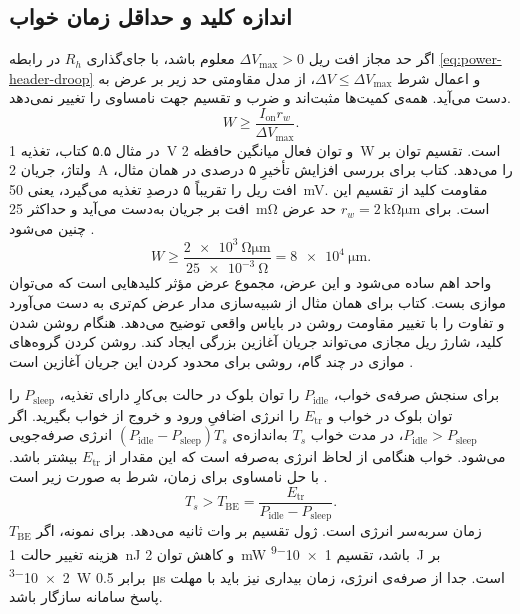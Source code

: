 \subsection{اندازه کلید و حداقل زمان خواب}
\label{sec:power-header-sizing}

اگر حد مجاز افت ریل \(\Delta V_{\max}>0\) معلوم باشد، با جای‌گذاری
\(R_h\) در رابطه \eqref{eq:power-header-droop} و اعمال شرط
\(\Delta V\leq\Delta V_{\max}\)، از مدل مقاومتی حد زیر بر عرض
به دست می‌آید. همه‌ی کمیت‌ها مثبت‌اند و ضرب و تقسیم جهت نامساوی
را تغییر نمی‌دهد.
\begin{equation}
  W\geq\frac{I_{\mathrm{on}}r_w}{\Delta V_{\max}}.
  \label{eq:power-header-width}
\end{equation}
در مثال ۵.۵ کتاب، تغذیه \qty{1}{\volt} و توان فعال میانگین حافظه
\qty{2}{\watt} است. تقسیم توان بر ولتاژ، جریان \qty{2}{\ampere}
را می‌دهد. کتاب برای بررسی افزایش تأخیرِ ۵ درصدی در همان مثال،
افت ریل را تقریباً ۵ درصدِ تغذیه می‌گیرد، یعنی
\qty{50}{\milli\volt}. مقاومت کلید از تقسیم این افت بر جریان
به‌دست می‌آید و حداکثر \qty{25}{\milli\ohm} است. برای
\(r_w=\qty{2}{\kilo\ohm\micro\metre}\) حد عرض چنین می‌شود
\cite[مثال ۵.۵، صفحات ۱۹۸ و ۱۹۹]{weste}.
\[
  W\geq\frac{\qty{2e3}{\ohm\micro\metre}}{\qty{25e-3}{\ohm}}
    =\qty{8e4}{\micro\metre}.
\]
واحد اهم ساده می‌شود و این عرض، مجموع عرض مؤثر کلیدهایی است که
می‌توان موازی بست. کتاب برای همان مثال از شبیه‌سازی مدار عرض کم‌تری
به دست می‌آورد و تفاوت را با تغییر مقاومت روشن در بایاس واقعی توضیح
می‌دهد. هنگام روشن شدن کلید، شارژ ریل مجازی می‌تواند جریان آغازین
بزرگی ایجاد کند. روشن کردن گروه‌های موازی در چند گام، روشی برای
محدود کردن این جریان آغازین است \cite[صفحه ۱۹۹]{weste}.

برای سنجش صرفه‌ی خواب، \(P_{\mathrm{idle}}\) را توان بلوک در حالت
بی‌کارِ دارای تغذیه، \(P_{\mathrm{sleep}}\) را توان بلوک در خواب و
\(E_{\mathrm{tr}}\) را انرژی اضافیِ ورود و خروج از خواب بگیرید.
اگر \(P_{\mathrm{idle}}>P_{\mathrm{sleep}}\)، در مدت خواب \(T_s\)
به‌اندازه‌ی \((P_{\mathrm{idle}}-P_{\mathrm{sleep}})T_s\) انرژی
صرفه‌جویی می‌شود. خواب هنگامی از لحاظ انرژی به‌صرفه است که این مقدار
از \(E_{\mathrm{tr}}\) بیشتر باشد. با حل نامساوی برای زمان، شرط
به صورت زیر است \cite[بخش ، صفحات ۱۹۷ و ۱۹۸]{weste}.
\begin{equation}
  T_s > T_{\mathrm{BE}}
      =\frac{E_{\mathrm{tr}}}{P_{\mathrm{idle}}-P_{\mathrm{sleep}}}.
  \label{eq:power-gating-break-even}
\end{equation}
\(T_{\mathrm{BE}}\) زمان سربه‌سر انرژی است. ژول تقسیم بر وات
ثانیه می‌دهد. برای نمونه، اگر هزینه تغییر حالت \qty{1}{\nano\joule}
و کاهش توان \qty{2}{\milli\watt} باشد، تقسیم
\qty{1e-9}{\joule} بر \qty{2e-3}{\watt} برابر
\qty{0.5}{\micro\second} است. جدا از صرفه‌ی انرژی، زمان بیداری
نیز باید با مهلت پاسخ سامانه سازگار باشد.
